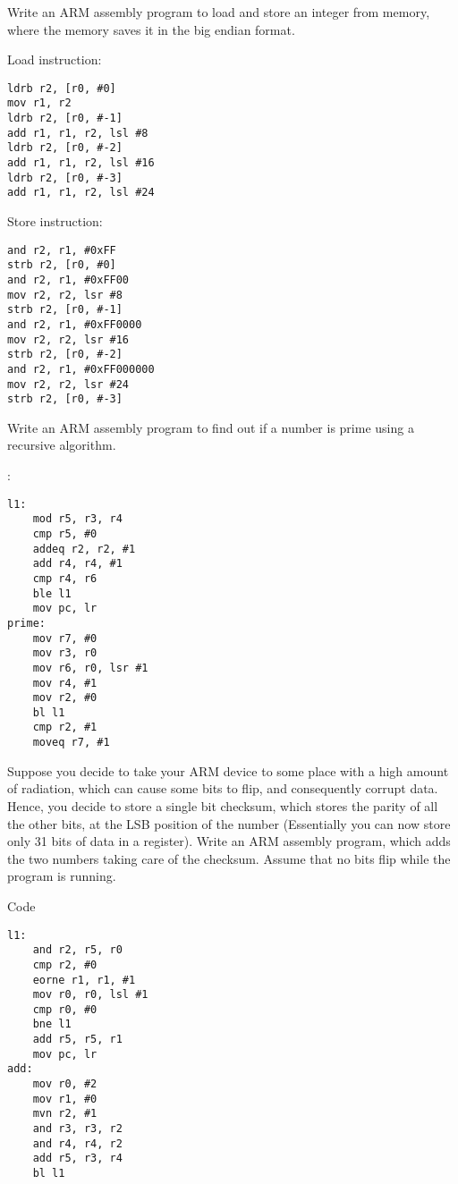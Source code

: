 \begin{ExerciseList}
\Exercise
Write an ARM assembly program to load and store an integer from memory, where the memory saves it in the
big endian format.

\Answer
Load instruction:
\begin{Verbatim}[frame=single]
ldrb r2, [r0, #0]
mov r1, r2
ldrb r2, [r0, #-1]
add r1, r1, r2, lsl #8
ldrb r2, [r0, #-2]
add r1, r1, r2, lsl #16
ldrb r2, [r0, #-3]
add r1, r1, r2, lsl #24
\end{Verbatim}

Store instruction:
\begin{Verbatim}[frame=single]
and r2, r1, #0xFF
strb r2, [r0, #0]
and r2, r1, #0xFF00
mov r2, r2, lsr #8
strb r2, [r0, #-1]
and r2, r1, #0xFF0000
mov r2, r2, lsr #16
strb r2, [r0, #-2]
and r2, r1, #0xFF000000
mov r2, r2, lsr #24
strb r2, [r0, #-3]
\end{Verbatim}






\Exercise
Write an ARM assembly program to find out if a number is prime using a recursive algorithm.

\Answer:
\begin{Verbatim}[frame=single]
l1:
	mod r5, r3, r4
	cmp r5, #0
	addeq r2, r2, #1
	add r4, r4, #1
	cmp r4, r6
	ble l1
	mov pc, lr
prime:
	mov r7, #0
	mov r3, r0
	mov r6, r0, lsr #1
	mov r4, #1
	mov r2, #0
	bl l1
	cmp r2, #1
	moveq r7, #1
\end{Verbatim}




\Exercise[difficulty=1]
Suppose you decide to take your ARM device to some place with a high amount of radiation,
which can cause some bits to flip, and consequently corrupt data. 
Hence, you decide to store a single bit checksum, which stores the parity of all the other bits, 
at the LSB position of the number (Essentially you can now store only 31 bits of data in a register).
Write an ARM assembly program, which adds the two numbers taking care of the checksum. 
Assume that no bits flip while the program is running. 

\Answer Code
\begin{Verbatim}[frame=single]
l1:
	and r2, r5, r0
	cmp r2, #0
	eorne r1, r1, #1
	mov r0, r0, lsl #1
	cmp r0, #0
	bne l1
	add r5, r5, r1
	mov pc, lr
add:
	mov r0, #2
	mov r1, #0
	mvn r2, #1
	and r3, r3, r2
	and r4, r4, r2
	add r5, r3, r4
	bl l1
\end{Verbatim}






\end{ExerciseList}

